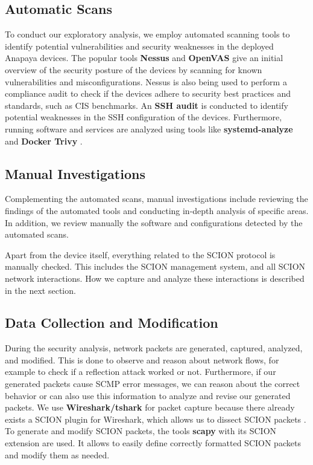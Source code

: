 \subsection{Automatic Scans}
To conduct our exploratory analysis, we employ automated scanning tools to identify potential vulnerabilities and security weaknesses in the deployed Anapaya devices.
The popular tools \textbf{Nessus} and \textbf{OpenVAS} give an initial overview of the security posture of the devices by scanning for known vulnerabilities and misconfigurations.
Nessus is also being used to perform a compliance audit to check if the devices adhere to security best practices and standards, such as CIS benchmarks.
An \textbf{SSH audit} is conducted to identify potential weaknesses in the SSH configuration of the devices.
Furthermore, running software and services are analyzed using tools like \textbf{systemd-analyze} \cite{systemdAnalyze} and \textbf{Docker Trivy} \cite{trivy}.


\subsection{Manual Investigations}
Complementing the automated scans, manual investigations include reviewing the findings of the automated tools and conducting in-depth analysis of specific areas.
In addition, we review manually the software and configurations detected by the automated scans.

Apart from the device itself, everything related to the SCION protocol is manually checked.
This includes the SCION management system, and all SCION network interactions.
How we capture and analyze these interactions is described in the next section.


\subsection{Data Collection and Modification}
During the security analysis, network packets are generated, captured, analyzed, and modified.
This is done to observe and reason about network flows, for example to check if a reflection attack worked or not.
Furthermore, if our generated packets cause SCMP error messages, we can reason about the correct behavior or can also use this information to analyze and revise our generated packets.
We use \textbf{Wireshark/tshark} \cite{wireshark} for packet capture because there already exists a SCION plugin for Wireshark, which allows us to dissect SCION packets \cite{wiresharkSCION}.
To generate and modify SCION packets, the tools \textbf{scapy} \cite{scapy} with its SCION extension \cite{scapySCION} are used.
It allows to easily define correctly formatted SCION packets and modify them as needed.

